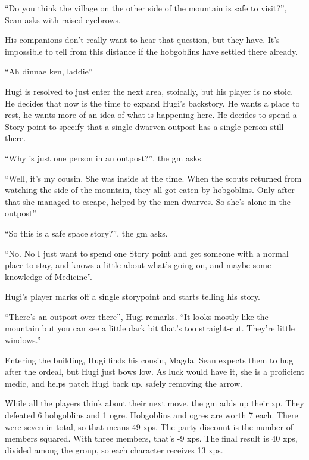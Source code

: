 
\begin{exampletext}

  ``Do you think the village on the other side of the mountain is safe to visit?'', Sean asks with raised eyebrows.
  
  His companions don't really want to hear that question, but they have.
  It's impossible to tell from this distance if the hobgoblins have settled there already.
  
  ``Ah dinnae ken, laddie''
  
  Hugi is resolved to just enter the next area, stoically, but his player is no stoic.
  He decides that now is the time to expand Hugi's backstory.
  He wants a place to rest, he wants more of an idea of what is happening here.
  He decides to spend a Story point to specify that a single dwarven outpost has a single person still there.
  
  ``Why is just one person in an outpost?'', the \gls{gm} asks.
  
  ``Well, it's my cousin.
  She was inside at the time. When the scouts returned from watching the side of the mountain, they all got eaten by hobgoblins.
  Only after that she managed to escape, helped by the men-dwarves. So she's alone in the outpost''
  
  ``So this is a safe space story?'', the \gls{gm} asks.
  
  ``No. No I just want to spend one Story point and get someone with a normal place to stay, and knows a little about what's going on, and maybe some knowledge of Medicine''.
  
  Hugi's player marks off a single \gls{storypoint} and starts telling his story.
  
  ``There's an outpost over there'', Hugi remarks.
  ``It looks mostly like the mountain but you can see a little dark bit that's too straight-cut.
  They're little windows.''
  

  Entering the building, Hugi finds his cousin, Magda.
  Sean expects them to hug after the ordeal, but Hugi just bows low.
  As luck would have it, she is a proficient medic, and helps patch Hugi back up, safely removing the arrow.
  
While all the players think about their next move, the \gls{gm} adds up their \gls{xp}.
They defeated 6 hobgoblins and 1 ogre.
Hobgoblins and ogres are worth 7 each.
There were seven in total, so that means 49 \glspl{xp}.
The party discount is the number of members squared.
With three members, that's -9 \glspl{xp}.
The final result is 40 \glspl{xp}, divided among the group, so each character receives 13 \glspl{xp}.


\end{exampletext}
